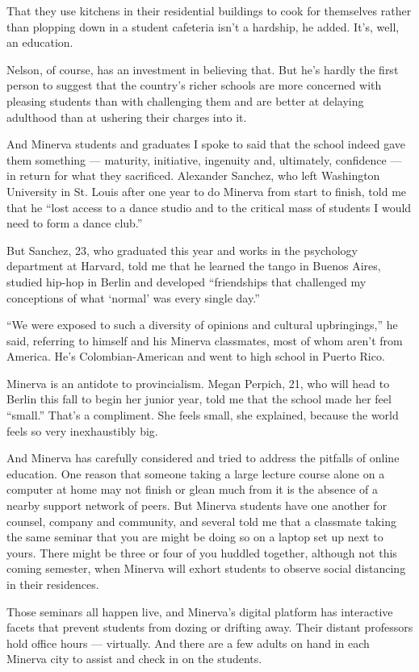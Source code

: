 That they use kitchens in their residential buildings to cook for
themselves rather than plopping down in a student cafeteria isn't a
hardship, he added. It's, well, an education.

Nelson, of course, has an investment in believing that. But he's hardly
the first person to suggest that the country's richer schools are more
concerned with pleasing students than with challenging them and are
better at delaying adulthood than at ushering their charges into it.

And Minerva students and graduates I spoke to said that the school
indeed gave them something --- maturity, initiative, ingenuity and,
ultimately, confidence --- in return for what they sacrificed. Alexander
Sanchez, who left Washington University in St. Louis after one year to
do Minerva from start to finish, told me that he ``lost access to a
dance studio and to the critical mass of students I would need to form a
dance club.''

But Sanchez, 23, who graduated this year and works in the psychology
department at Harvard, told me that he learned the tango in Buenos
Aires, studied hip-hop in Berlin and developed ``friendships that
challenged my conceptions of what `normal' was every single day.''

``We were exposed to such a diversity of opinions and cultural
upbringings,'' he said, referring to himself and his Minerva classmates,
most of whom aren't from America. He's Colombian-American and went to
high school in Puerto Rico.

Minerva is an antidote to provincialism. Megan Perpich, 21, who will
head to Berlin this fall to begin her junior year, told me that the
school made her feel ``small.'' That's a compliment. She feels small,
she explained, because the world feels so very inexhaustibly big.

And Minerva has carefully considered and tried to address the pitfalls
of online education. One reason that someone taking a large lecture
course alone on a computer at home may not finish or glean much from it
is the absence of a nearby support network of peers. But Minerva
students have one another for counsel, company and community, and
several told me that a classmate taking the same seminar that you are
might be doing so on a laptop set up next to yours. There might be three
or four of you huddled together, although not this coming semester, when
Minerva will exhort students to observe social distancing in their
residences.

Those seminars all happen live, and Minerva's digital platform has
interactive facets that prevent students from dozing or drifting away.
Their distant professors hold office hours --- virtually. And there are
a few adults on hand in each Minerva city to assist and check in on the
students.

